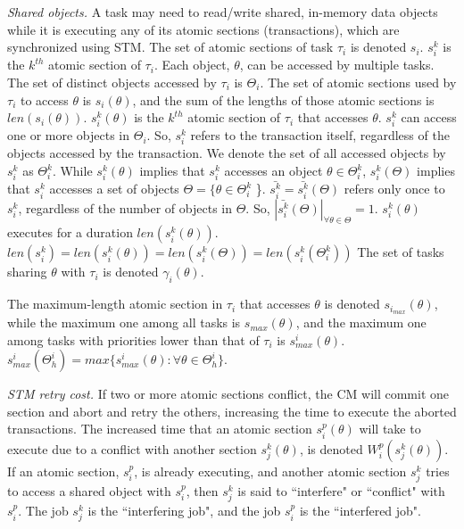 \documentclass[preprint]{sigplanconf}
\begin{document}
\textit{Shared objects.}
 A task may need to read/write shared, in-memory data objects while it is executing any of its atomic sections (transactions), which are synchronized using STM. 
The set of atomic sections of task $\tau_i$ is denoted $s_i$. $s_i^k$ is the $k^{th}$ atomic section of $\tau_i$. Each object, $\theta$, can be accessed by multiple tasks. The set of distinct objects accessed by $\tau_i$ is $\Theta_i$. The set of atomic sections used by $\tau_i$ to access $\theta$ is $s_i(\theta)$, and the sum of the lengths of those atomic sections is $len(s_i(\theta))$. $s_i^k(\theta)$ is the $k^{th}$ atomic section of $\tau_i$ that accesses $\theta$.
%
 $s_i^k$ can access one or more objects in $\Theta_i$. So, $s_i^k$ refers to the transaction itself, regardless of the objects accessed by the transaction. We denote the set of all accessed objects by $s_i^k$ as $\Theta_i^k$. While $s_i^k(\theta)$ implies that $s_i^k$ accesses an object $\theta \in \Theta_i^k$, $s_i^k(\Theta)$ implies that $s_i^k$ accesses a set of objects $\Theta=\{\theta \in \Theta_i^k$ \}. $\bar{s_i^k}=\bar{s_i^k}(\Theta)$ refers only once to $s_i^k$, regardless of the number of objects in $\Theta$. So, $|\bar{s_i^k}(\Theta)|_{\forall \theta \in \Theta}=1$.
%
 $s_i^k(\theta)$  executes for a duration $len(s_i^k(\theta))$. $len(s_i^k)=len(s_i^k(\theta))=len(s_i^k(\Theta))=len(s_i^k(\Theta_i^k))$ The set of tasks sharing $\theta$ with $\tau_i$ is denoted $\gamma_i(\theta)$. 

The maximum-length atomic section in $\tau_i$ that accesses $\theta$ is denoted $s_{i_{max}} (\theta)$, while the maximum one among all tasks is $s_{max} (\theta)$, and the maximum one among tasks with priorities lower than that of $\tau_i$ is $s_{max}^i (\theta)$. $s_{max}^i(\Theta_h^i)=max\{s_{max}^i(\theta):\forall \theta \in \Theta_h^i\}$.

\textit{STM retry cost.} If two or more atomic sections conflict, the CM will commit one section and abort and retry the others, increasing the time to execute the aborted transactions. The increased time that an atomic section $s_i^p (\theta)$ will take to execute due to a conflict with another section $s_j^k (\theta)$, is denoted $W_{i}^{p}(s_{j}^{k}(\theta))$. If an atomic section, $s_i^p$, is already executing, and another atomic section $s_j^k$ tries to access a shared object with $s_i^p$, then $s_j^k$ is said to ``interfere" or ``conflict" with $s_i^p$. The job $s_j^k$ is the ``interfering job", and the job $s_i^p$ is the ``interfered job".
\end{document}
